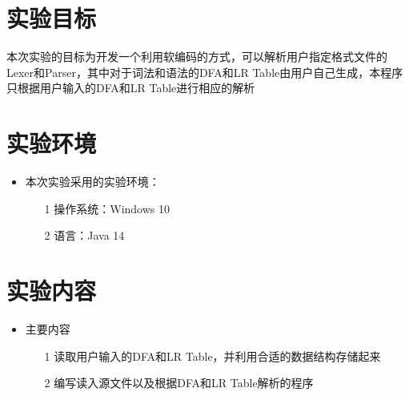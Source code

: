 \section{实验目标}
本次实验的目标为开发一个利用软编码的方式，可以解析用户指定格式文件的Lexer和Parser，其中对于词法和语法的DFA和LR Table由用户自己生成，本程序只根据用户输入的DFA和LR Table进行相应的解析
\section{实验环境}
\begin{itemize}
    \item 本次实验采用的实验环境：
    \begin{itemize}
        \item[1]操作系统：Windows 10
        \item[2]语言：Java 14
    \end{itemize}
\end{itemize}
\section{实验内容}
\begin{itemize}
    \item 主要内容
    \begin{itemize}
        \item[1]读取用户输入的DFA和LR Table，并利用合适的数据结构存储起来
        \item[2]编写读入源文件以及根据DFA和LR Table解析的程序
    \end{itemize}
\end{itemize}
